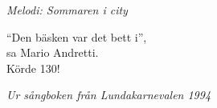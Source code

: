 {\footnotesize\textit{Melodi: Sommaren i city}}\par
\vspace{10pt}
``Den bäsken var det bett i'',\\
sa Mario Andretti.\\
Körde 130!\par
\vspace{10pt}
{\footnotesize\textit{Ur sångboken från Lundakarnevalen 1994}}
